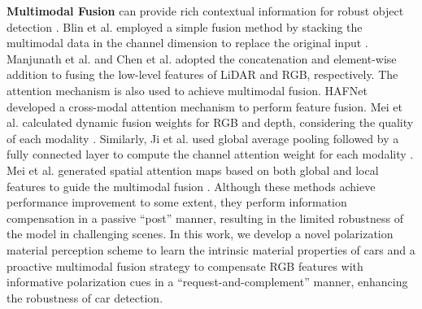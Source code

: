 \textbf{Multimodal Fusion} can provide rich contextual information for robust object detection \cite{valverde2021there, bijelic2020seeing}. Blin et al. employed a simple fusion method by stacking the multimodal data in the channel dimension to replace the original input \cite{blin2019road}. Manjunath et al. and Chen et al. adopted the concatenation \cite{manjunath2018radar} and element-wise addition \cite{chen2017multi} to fusing the low-level features of LiDAR and RGB, respectively. The attention mechanism \cite{vaswani2017attention} is also used to achieve multimodal fusion. HAFNet \cite{zhang2020hybrid} developed a cross-modal attention mechanism to perform feature fusion. Mei et al. calculated dynamic fusion weights for RGB and depth, considering the quality of each modality \cite{mei2021depth}. Similarly, Ji et al. used global average pooling followed by a fully connected layer to compute the channel attention weight for each modality \cite{ji2021calibrated}. Mei et al. generated spatial attention maps based on both global and local features to guide the multimodal fusion \cite{mei2022glass}. Although these methods achieve performance improvement to some extent, they perform information compensation in a passive ``post'' manner, resulting in the limited robustness of the model in challenging scenes. In this work, we develop a novel polarization material perception scheme to learn the intrinsic material properties of cars and a proactive multimodal fusion strategy to compensate RGB features with informative polarization cues in a ``request-and-complement'' manner, enhancing the robustness of car detection.

